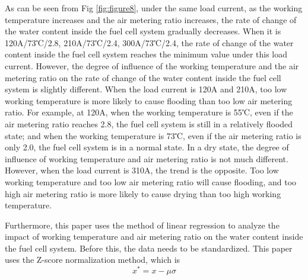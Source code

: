 As can be seen from Fig \ref{fig:figure8}, under the same load current, as the working temperature increases and the air metering ratio increases, the rate of change of the water content inside the fuel cell system gradually decreases. When it is 120A/73℃/2.8, 210A/73℃/2.4, 300A/73℃/2.4, the rate of change of the water content inside the fuel cell system reaches the minimum value under this load current. However, the degree of influence of the working temperature and the air metering ratio on the rate of change of the water content inside the fuel cell system is slightly different. When the load current is 120A and 210A, too low working temperature is more likely to cause flooding than too low air metering ratio. For example, at 120A, when the working temperature is 55℃, even if the air metering ratio reaches 2.8, the fuel cell system is still in a relatively flooded state; and when the working temperature is 73℃, even if the air metering ratio is only 2.0, the fuel cell system is in a normal state. In a dry state, the degree of influence of working temperature and air metering ratio is not much different. However, when the load current is 310A, the trend is the opposite. Too low working temperature and too low air metering ratio will cause flooding, and too high air metering ratio is more likely to cause drying than too high working temperature.

\par
Furthermore, this paper uses the method of linear regression to analyze the impact of working temperature and air metering ratio on the water content inside the fuel cell system. Before this, the data needs to be standardized. This paper uses the Z-score normalization method, which is
$$x^{*}=x-\mu\sigma$$

